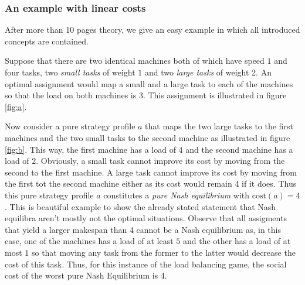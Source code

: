 \documentclass[a4paper,11pt]{article}
\newcommand{\cost}{\text{cost}}
\begin{document}
\subsubsection{An example with linear costs}
After more than 10 pages theory, we give an easy example in which all introduced concepts are contained.

Suppose that there are two identical machines both of which have speed $1$ and four tasks, two \emph{small tasks} of weight $1$ and two \emph{large tasks} of weight 2. An optimal assignment would map a small and a large task to each of the machines so that the load on both machines is $3$. This assignment is illustrated in figure \ref{fig:a}.

Now consider a pure strategy profile $a$ that maps the two large tasks to the first machines and the two small tasks to the second machine as illustrated in figure \ref{fig:b}. This way, the first machine has a load of $4$ and the second machine has a load of $2$. Obviously, a small task cannot improve its cost by moving from the second to the first machine. A large task cannot improve its cost by moving from the first tot the second machine either as its cost would remain 4 if it does. Thus this pure strategy profile $a$ constitutes a \emph{pure Nash equilibrium} with $\cost(a)=4$. This is beautiful example to show the already stated statement that Nash equilibra aren't mostly not the optimal situations. Observe that all assigments that yield a larger makespan than 4 cannot be a Nash equilibrium as, in this case, one of the machines has a load of at least $5$ and the other has a load of at most $1$ so that moving any task from the former to the latter would decrease the cost of this task. Thus, for this instance of the load balancing game, the social cost of the worst pure Nash Equilibrium is 4.
\end{document}
